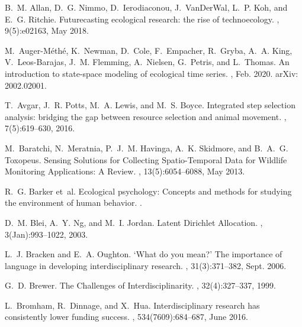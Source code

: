 \documentclass[a4paper,12pt]{article}
\begin{document}
\newpage


 
 

\begin{thebibliography}{10}
	
	B.~M. Allan, D.~G. Nimmo, D.~Ierodiaconou, J.~VanDerWal, L.~P. Koh, and E.~G.
	Ritchie.
	\newblock Futurecasting ecological research: the rise of technoecology.
	, 9(5):e02163, May 2018.
	
	M.~Auger-Méthé, K.~Newman, D.~Cole, F.~Empacher, R.~Gryba, A.~A. King,
	V.~Leos-Barajas, J.~M. Flemming, A.~Nielsen, G.~Petris, and L.~Thomas.
	\newblock An introduction to state-space modeling of ecological time series.
	, Feb. 2020.
	\newblock arXiv: 2002.02001.
	
	T.~Avgar, J.~R. Potts, M.~A. Lewis, and M.~S. Boyce.
	\newblock Integrated step selection analysis: bridging the gap between resource
	selection and animal movement.
	, 7(5):619--630, 2016.
	
	M.~Baratchi, N.~Meratnia, P.~J.~M. Havinga, A.~K. Skidmore, and B.~A.~G.
	Toxopeus.
	\newblock Sensing {Solutions} for {Collecting} {Spatio}-{Temporal} {Data} for
	{Wildlife} {Monitoring} {Applications}: {A} {Review}.
	, 13(5):6054--6088, May 2013.
	
	R.~G. Barker et~al.
	\newblock Ecological psychology: Concepts and methods for studying the
	environment of human behavior.
	.
	
	D.~M. Blei, A.~Y. Ng, and M.~I. Jordan.
	\newblock Latent {Dirichlet} {Allocation}.
	, 3(Jan):993--1022, 2003.
	
	L.~J. Bracken and E.~A. Oughton.
	\newblock ‘{What} do you mean?’ {The} importance of language in developing
	interdisciplinary research.
	,
	31(3):371--382, Sept. 2006.
	
	G.~D. Brewer.
	\newblock The {Challenges} of {Interdisciplinarity}.
	, 32(4):327--337, 1999.
	
	L.~Bromham, R.~Dinnage, and X.~Hua.
	\newblock Interdisciplinary research has consistently lower funding success.
	, 534(7609):684--687, June 2016.
	

\end{thebibliography}
\end{document}
